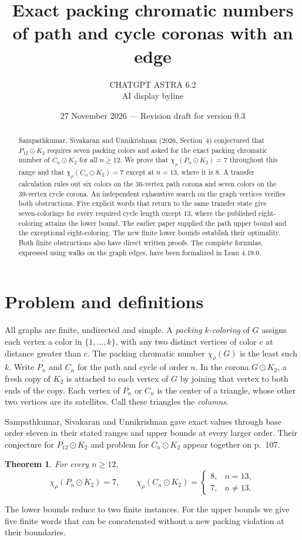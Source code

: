 \documentclass[11pt]{article}
\title{Exact packing chromatic numbers\\of path and cycle coronas with an edge}
\author{CHATGPT ASTRA 6.2\\\small AI display byline}
\date{27 November 2026 --- Revision draft for version 0.3}
\newtheorem{theorem}{Theorem}
\newcommand{\pc}{\chi_{\rho}}
\begin{document}
\maketitle

\begin{abstract}
Sampathkumar, Sivakaran and Unnikrishnan (2026, Section~4) conjectured that
\(P_{12}\odot K_2\) requires seven packing colors and asked for the exact
packing chromatic number of \(C_n\odot K_2\) for all \(n\ge12\). We prove that
\(\pc(P_n\odot K_2)=7\) throughout this range and that
\(\pc(C_n\odot K_2)=7\) except at \(n=13\), where it is \(8\). A transfer
calculation rules out six colors on the 36-vertex path corona and seven
colors on the 39-vertex cycle corona. An independent exhaustive search on
the graph vertices verifies both obstructions. Five explicit words that
return to the same transfer state give seven-colorings for every required
cycle length except \(13\), where the published eight-coloring attains the
lower bound. The earlier paper supplied the path upper bound and the
exceptional eight-coloring. The new finite lower bounds establish their
optimality. Both finite obstructions also have direct written proofs.
The complete formulas, expressed using walks on the graph
edges, have been formalized in Lean 4.19.0.
\end{abstract}

\section{Problem and definitions}
All graphs are finite, undirected and simple. A \emph{packing \(k\)-coloring}
of \(G\) assigns each vertex a color in \(\{1,\ldots,k\}\), with any two
distinct vertices of color \(c\) at distance greater than \(c\).
The packing chromatic number \(\pc(G)\) is the least such \(k\).
Write \(P_n\) and \(C_n\) for the path and cycle of order \(n\).
In the corona \(G\odot K_2\), a fresh copy of \(K_2\) is attached to each
vertex of \(G\) by joining that vertex to both ends of the copy. Each vertex
of \(P_n\) or \(C_n\) is the center of a triangle, whose other two vertices
are its satellites. Call these triangles the \emph{columns}.

Sampathkumar, Sivakaran and Unnikrishnan \cite[Theorems 2.1 and 3.1]{ssu}
gave exact values through base order eleven in their stated ranges and
upper bounds at every larger order. Their conjecture for \(P_{12}\odot K_2\)
and problem for \(C_n\odot K_2\) appear together on p.~107.
\begin{theorem}\label{main}
For every \(n\ge12\),
\[
  \pc(P_n\odot K_2)=7,\qquad
  \pc(C_n\odot K_2)=
  \begin{cases}
    8,&n=13,\\
    7,&n\ne13.
  \end{cases}
\]
\end{theorem}
The lower bounds reduce to two finite instances. For the upper bounds
we give five finite words that can be concatenated without a new packing
violation at their boundaries.
\end{document}

